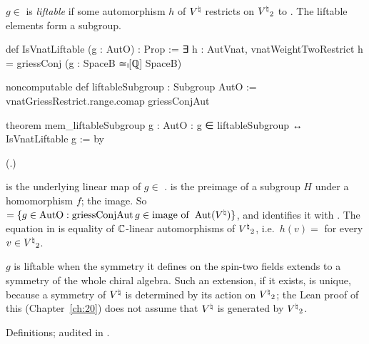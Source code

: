 \begin{definition}\label{ch21:def:liftable}
$g\in$  is \emph{liftable} if some automorphism $h$ of ${V^{\natural}}$ restricts on ${V^{\natural}}_2$ to
.  The liftable elements form a subgroup.
\end{definition}
\begin{leancode}
def IsVnatLiftable (g : AutO) : Prop :=
  ∃ h : AutVnat, vnatWeightTwoRestrict h = griessConj (g : SpaceB ≃ₗ[ℚ] SpaceB)
\end{leancode}
\begin{leancode}
noncomputable def liftableSubgroup : Subgroup AutO :=
  vnatGriessRestrict.range.comap griessConjAut
\end{leancode}
\begin{leancode}
theorem mem_liftableSubgroup {g : AutO} : g ∈ liftableSubgroup ↔ IsVnatLiftable g := by
\end{leancode}
(.)
\begin{dictionary}
 is the underlying linear map of $g\in$ .
 is the preimage of a subgroup $H$ under a homomorphism $f$;  the image.
So  $=\{g\in\mathrm{AutO}:\mathrm{griessConjAut}\,g\in\mathrm{image\ of}\ \Aut(\Vnat)\}$,
and  identifies it with .  The equation in
 is equality of ${\mathbb{C}}$-linear automorphisms of ${V^{\natural}}_2$, i.e.\ $h(v)=$
 for every $v\in{V^{\natural}}_2$.
\end{dictionary}
\begin{physics}
$g$ is liftable when the symmetry it defines on the spin-two fields extends to a symmetry of the whole
chiral algebra.  Such an extension, if it exists, is unique, because a symmetry of ${V^{\natural}}$ is determined by
its action on ${V^{\natural}}_2$; the Lean proof of this (Chapter~\ref{ch:20}) does not assume that ${V^{\natural}}$ is
generated by ${V^{\natural}}_2$.
\end{physics}
\begin{status}
Definitions; audited in .
\end{status}

